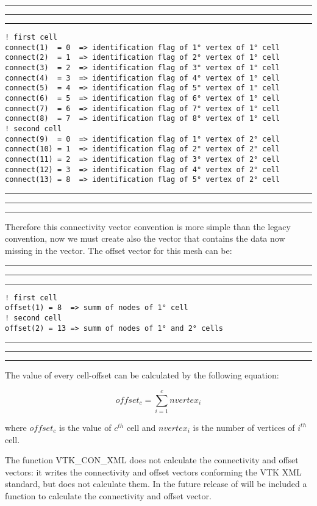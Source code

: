 \documentclass[pagesize=pdftex,fontsize=10pt,paper=a4,oneside]{scrbook}
\DeclareRobustCommand{\MarginNote}[1]{\marginpar{%
\slshape\footnotesize%
\parindent=0pt\lineskip=0pt\lineskiplimit=0pt%
\tolerance=2000\hyphenpenalty=300\exhyphenpenalty=300%
\doublehyphendemerits=100000\finalhyphendemerits=\doublehyphendemerits%
\raggedright\hspace{0pt}#1}}
\newenvironment{boxred}[1]%
               {%
                \noindent\hspace*{-0.025\textwidth}%
                \color{Maroon}%
                \rule[-5.8pt]{0.6pt}{6pt}\hspace*{-0.6pt}\rule{1.05\textwidth}{0.6pt}\hspace*{-0.6pt}\rule[-5.8pt]{0.6pt}{6pt}%
                \color{black}%
                \vspace*{0.6pt}\MarginNote{\color{Maroon}{#1}}%
               }%
               {%
                \noindent\hspace*{-0.025\textwidth}%
                \color{Maroon}%
                \rule[0pt]{0.6pt}{6pt}\hspace*{-0.6pt}\rule{1.05\textwidth}{0.6pt}\hspace*{-0.6pt}\rule[0pt]{0.6pt}{6pt}%
                \color{black}%
                \vspace*{2mm}%
               }
\DeclareRobustCommand{\MaiuscolettoBS}[1]{\textls[80]{\scshape\MakeTextLowercase{#1}}}
\begin{document}
\begin{boxred}{Connectivity vector example for VTK XML standard}
\begin{verbatim}
! first cell
connect(1)  = 0  => identification flag of 1° vertex of 1° cell
connect(2)  = 1  => identification flag of 2° vertex of 1° cell
connect(3)  = 2  => identification flag of 3° vertex of 1° cell
connect(4)  = 3  => identification flag of 4° vertex of 1° cell
connect(5)  = 4  => identification flag of 5° vertex of 1° cell
connect(6)  = 5  => identification flag of 6° vertex of 1° cell
connect(7)  = 6  => identification flag of 7° vertex of 1° cell
connect(8)  = 7  => identification flag of 8° vertex of 1° cell
! second cell
connect(9)  = 0  => identification flag of 1° vertex of 2° cell
connect(10) = 1  => identification flag of 2° vertex of 2° cell
connect(11) = 2  => identification flag of 3° vertex of 2° cell
connect(12) = 3  => identification flag of 4° vertex of 2° cell
connect(13) = 8  => identification flag of 5° vertex of 2° cell
\end{verbatim}
\end{boxred}

Therefore this connectivity vector convention is more simple than the legacy convention, now we must create also the
\MaiuscolettoBS{offset} vector that contains the data now missing in the \MaiuscolettoBS{connect} vector. The offset
vector for this mesh can be:

\begin{boxred}{Offset vector example for VTK XML standard}
\begin{verbatim}
! first cell
offset(1) = 8  => summ of nodes of 1° cell
! second cell
offset(2) = 13 => summ of nodes of 1° and 2° cells
\end{verbatim}
\end{boxred}

\noindent The value of every cell-offset can be calculated by the following equation:

\begin{equation}
offset_c = \sum\limits_{i = 1}^{c} {nvertex_i }
\label{eq:xml offset vlue}
\end{equation}

\noindent where $offset_c$ is the value of $c^{th}$ cell and $nvertex_i$ is the number of vertices of $i^{th}$ cell.

The function VTK\_CON\_XML does not calculate the connectivity and offset vectors: it writes the connectivity and offset
vectors conforming the VTK XML standard, but does not calculate them. In the future release of \LIBVTKIO will be included
a function to calculate the connectivity and offset vector.
\end{document}
